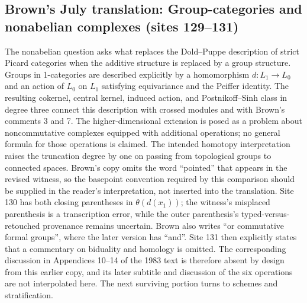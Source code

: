 \documentclass[10pt,oneside]{book}
\begin{document}
\subsection*{Brown's July translation: Group-categories and nonabelian complexes (sites 129--131)}
The nonabelian question asks what replaces the Dold--Puppe description of strict Picard categories when the additive structure is replaced by a group structure. Groups in 1-categories are described explicitly by a homomorphism $d:L_1\to L_0$ and an action of $L_0$ on $L_1$ satisfying equivariance and the Peiffer identity. The resulting cokernel, central kernel, induced action, and Postnikoff--Sinh class in degree three connect this description with crossed modules and with Brown's comments 3 and 7. The higher-dimensional extension is posed as a problem about noncommutative complexes equipped with additional operations; no general formula for those operations is claimed. The intended homotopy interpretation raises the truncation degree by one on passing from topological groups to connected spaces. Brown's copy omits the word ``pointed'' that appears in the revised witness, so the basepoint convention required by this comparison should be supplied in the reader's interpretation, not inserted into the translation. Site 130 has both closing parentheses in $\theta(d(x_1))$; the witness's misplaced parenthesis is a transcription error, while the outer parenthesis's typed-versus-retouched provenance remains uncertain. Brown also writes ``or commutative formal groups'', where the later version has ``and''. Site 131 then explicitly states that a commentary on biduality and homology is omitted. The corresponding discussion in Appendices 10--14 of the 1983 text is therefore absent by design from this earlier copy, and its later subtitle and discussion of the six operations are not interpolated here. The next surviving portion turns to schemes and stratification.
\end{document}
